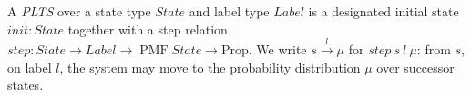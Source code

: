 \begin{definition}
  \label{def:system}
  \leanok
  A \emph{PLTS} over a state type $State$ and label type $Label$ is a designated
  initial state $init : State$ together with a step relation
  $step : State \to Label \to \operatorname{PMF} State \to \mathrm{Prop}$. We write
  $s \xrightarrow{l} \mu$ for $step\ s\ l\ \mu$: from $s$, on label $l$, the system
  may move to the probability distribution $\mu$ over successor states.
\end{definition}
